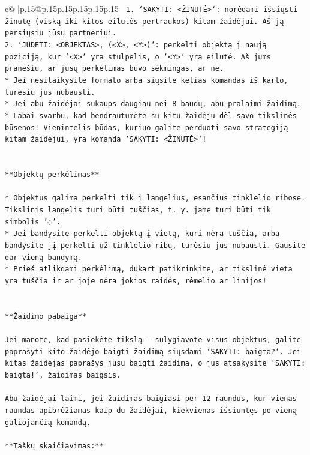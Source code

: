 \documentclass{article}
\begin{document}
{\begin{supertabular}{c@{$\;$}|p{.15\linewidth}@{}p{.15\linewidth}p{.15\linewidth}p{.15\linewidth}p{.15\linewidth}p{.15\linewidth}}
{{{\texttt{ 1. `SAKYTI: <ŽINUTĖ>`: norėdami išsiųsti žinutę (viską iki kitos eilutės pertraukos) kitam žaidėjui. Aš ją persiųsiu jūsų partneriui.} \\
\texttt{2. `JUDĖTI: <OBJEKTAS>, (<X>, <Y>)`: perkelti objektą į naują poziciją, kur `<X>` yra stulpelis, o `<Y>` yra eilutė. Aš jums pranešiu, ar jūsų perkėlimas buvo sėkmingas, ar ne.} \\
\texttt{* Jei nesilaikysite formato arba siųsite kelias komandas iš karto, turėsiu jus nubausti.} \\
\texttt{* Jei abu žaidėjai sukaups daugiau nei 8 baudų, abu pralaimi žaidimą.} \\
\texttt{* Labai svarbu, kad bendrautumėte su kitu žaidėju dėl savo tikslinės būsenos! Vienintelis būdas, kuriuo galite perduoti savo strategiją kitam žaidėjui, yra komanda `SAKYTI: <ŽINUTĖ>`!} \\
\\ 
\\ 
\texttt{**Objektų perkėlimas**} \\
\\ 
\texttt{* Objektus galima perkelti tik į langelius, esančius tinklelio ribose. Tikslinis langelis turi būti tuščias, t. y. jame turi būti tik simbolis '◌'.} \\
\texttt{* Jei bandysite perkelti objektą į vietą, kuri nėra tuščia, arba bandysite jį perkelti už tinklelio ribų, turėsiu jus nubausti. Gausite dar vieną bandymą.} \\
\texttt{* Prieš atlikdami perkėlimą, dukart patikrinkite, ar tikslinė vieta yra tuščia ir ar joje nėra jokios raidės, rėmelio ar linijos!} \\
\\ 
\\ 
\texttt{**Žaidimo pabaiga**} \\
\\ 
\texttt{Jei manote, kad pasiekėte tikslą {-} sulygiavote visus objektus, galite paprašyti kito žaidėjo baigti žaidimą siųsdami `SAKYTI: baigta?`. Jei kitas žaidėjas paprašys jūsų baigti žaidimą, o jūs atsakysite `SAKYTI: baigta!`, žaidimas baigsis.} \\
\\ 
\texttt{Abu žaidėjai laimi, jei žaidimas baigiasi per 12 raundus, kur vienas raundas apibrėžiamas kaip du žaidėjai, kiekvienas išsiuntęs po vieną galiojančią komandą.} \\
\\ 
\texttt{**Taškų skaičiavimas:**} \\
\\ 
}}}
\end{supertabular}}
\end{document}
